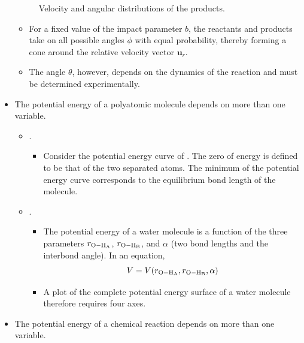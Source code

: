 \documentclass[../notes.tex]{subfiles}
\begin{document}
\begin{itemize}
\begin{figure}[h!]
        \caption{Velocity and angular distributions of the products.}
        \label{fig:velocityAngleDist}
    \end{figure}
    \begin{itemize}
        \item For a fixed value of the impact parameter $b$, the reactants and products take on all possible angles $\phi$ with equal probability, thereby forming a cone around the relative velocity vector $\mathbf{u}_r$.
        \item The angle $\theta$, however, depends on the dynamics of the reaction and must be determined experimentally.
    \end{itemize}
    \item The potential energy of a polyatomic molecule depends on more than one variable.
    \begin{itemize}
        \item {}.
        \begin{itemize}
            \item Consider the potential energy curve of . The zero of energy is defined to be that of the two separated atoms. The minimum of the potential energy curve corresponds to the equilibrium bond length of the  molecule.
        \end{itemize}
        \item {}.
        \begin{itemize}
            \item The potential energy of a water molecule is a function of the three parameters $r_{\ce{O-H_A}}$, $r_{\ce{O-H_B}}$, and $\alpha$ (two bond lengths and the interbond angle). In an equation,
            \begin{equation*}
                V = V(r_{\ce{O-H_A}},r_{\ce{O-H_B}},\alpha)
            \end{equation*}
            \item A plot of the complete potential energy surface of a water molecule therefore requires four axes.
        \end{itemize}
    \end{itemize}
    \item The potential energy of a chemical reaction depends on more than one variable.
    \begin{figure}[H]
        \centering
        \footnotesize
        \begin{subfigure}[b]{0.3\linewidth}
            \centering
\end{subfigure}
\end{figure}
\end{itemize}
\end{document}
